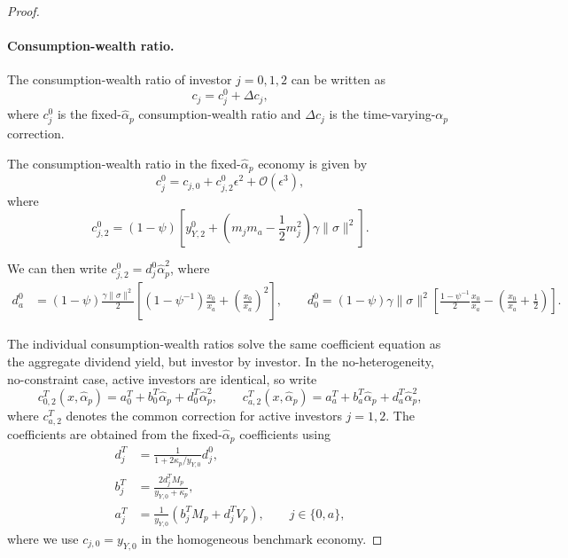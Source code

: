 \begin{proof}
\paragraph{Consumption-wealth ratio.}
The consumption-wealth ratio of investor $j=0,1,2$ can be written as
\begin{equation}
    c_j = c_j^0 + \Delta c_j,
\end{equation}
where $c_j^0$ is the fixed-$\hat{\alpha}_p$ consumption-wealth ratio and $\Delta c_j$ is the time-varying-$\alpha_p$ correction.

The consumption-wealth ratio in the fixed-$\hat{\alpha}_p$ economy is given by
\begin{equation}
    c_{j}^0 = c_{j,0} + c_{j,2}^0 \epsilon^2 + \mathcal{O}(\epsilon^3),
\end{equation}
where 
\begin{equation}
    c_{j,2}^0 = (1-\psi) \left[ y_{Y,2}^0 + \left(m_{j}m_{a}  - \frac{1}{2}m_j^2  \right)\gamma \|\sigma\|^2 \right].
\end{equation}

We can then write $c_{j,2}^0 = d_{j}^0 \hat{\alpha}_p^2$, where
\begin{align}
    d_{a}^0 &= (1-\psi)\frac{\gamma \|\sigma\|^2}{2} \left[ (1-\psi^{-1}) \frac{x_0}{x_a} + \left( \frac{x_0}{x_a} \right)^2  \right], \qquad 
    d_{0}^0 = (1-\psi)\gamma \|\sigma\|^2 \left[ \frac{1-\psi^{-1}}{2} \frac{x_0}{x_a} - \left( \frac{x_0}{x_a} +\frac{1}{2}\right)  \right].
\end{align}

The individual consumption-wealth ratios solve the same coefficient equation as the aggregate dividend yield, but investor by investor.
In the no-heterogeneity, no-constraint case, active investors are identical, so write
\begin{equation}
    c_{0,2}^{T}(x,\hat{\alpha}_p)
    =a_0^T+b_0^T\hat{\alpha}_p+d_0^T\hat{\alpha}_p^2,
    \qquad
    c_{a,2}^{T}(x,\hat{\alpha}_p)
    =a_a^T+b_a^T\hat{\alpha}_p+d_a^T\hat{\alpha}_p^2,
\end{equation}
where $c_{a,2}^{T}$ denotes the common correction for active investors $j=1,2$.
The coefficients are obtained from the fixed-$\hat{\alpha}_p$ coefficients using
\begin{align}
    d_j^T
    &=\frac{1}{1+2\kappa_p/y_{Y,0}}d_j^0,\\
    b_j^T
    &=\frac{2d_j^TM_p}{y_{Y,0}+\kappa_p},\\
    a_j^T
    &=\frac{1}{y_{Y,0}}\left(b_j^TM_p+d_j^TV_p\right),
    \qquad j\in\{0,a\},
\end{align}
where we use $c_{j,0}=y_{Y,0}$ in the homogeneous benchmark economy.


\end{proof}
